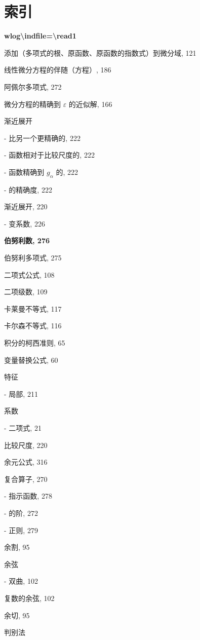 \chapter*{索引}
{}

\par\noindent\textbf{\texorpdfstring{wlog\textbackslash indfile=\textbackslash read1}{wlog=}}\par

添加（多项式的根、原函数、原函数的指数式）到微分域, 121

线性微分方程的伴随（方程）, 186

阿佩尔多项式, 272

微分方程的精确到 \(\varepsilon\) 的近似解, 166

渐近展开

- 比另一个更精确的, 222

- 函数相对于比较尺度的, 222

- 函数精确到 \(g_{\alpha}\) 的, 222

- 的精确度, 222

渐近展开, 220

- 变系数, 226

\par\noindent\textbf{伯努利数, 276}\par

伯努利多项式, 275

二项式公式, 108

二项级数, 109

卡莱曼不等式, 117

卡尔森不等式, 116

积分的柯西准则, 65

变量替换公式, 60

特征

- 局部, 211

系数

- 二项式, 21

比较尺度, 220

余元公式, 316

复合算子, 270

- 指示函数, 278

- 的阶, 272

- 正则, 279

余割, 95

余弦

- 双曲, 102

复数的余弦, 102

余切, 95

判别法

